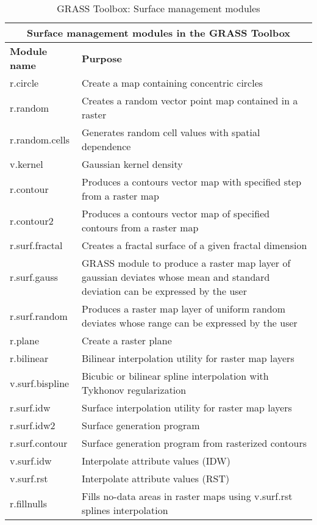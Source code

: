 \begin{table}[ht]
\centering
\caption{GRASS Toolbox: Surface management modules}\medskip
 \begin{tabular}{|p{4cm}|p{12cm}|}
  \hline \multicolumn{2}{|c|}{\textbf{Surface management modules in the GRASS
  Toolbox}} \\
  \hline \textbf{Module name} & \textbf{Purpose} \\
  \hline r.circle & Create a map containing concentric circles \\
  \hline r.random & Creates a random vector point map contained in a raster \\
  \hline r.random.cells & Generates random cell values with spatial
  dependence \\
  \hline v.kernel & Gaussian kernel density \\
  \hline r.contour & Produces a contours vector map with specified step from
  a raster map\\
  \hline r.contour2 & Produces a contours vector map of specified contours
  from a raster map \\
  \hline r.surf.fractal & Creates a fractal surface of a given fractal
  dimension\\
  \hline r.surf.gauss & GRASS module to produce a raster map layer of
  gaussian deviates whose mean and standard deviation can be expressed by the
  user \\
  \hline r.surf.random & Produces a raster map layer of uniform random
  deviates whose range can be expressed by the user \\
  \hline r.plane & Create a raster plane \\
  \hline r.bilinear & Bilinear interpolation utility for raster map layers \\
  \hline v.surf.bispline & Bicubic or bilinear spline interpolation with
  Tykhonov regularization\\
  \hline r.surf.idw & Surface interpolation utility for raster map layers\\
  \hline r.surf.idw2 & Surface generation program\\
  \hline r.surf.contour & Surface generation program from rasterized contours \\
  \hline v.surf.idw & Interpolate attribute values (IDW) \\
  \hline v.surf.rst & Interpolate attribute values (RST) \\
  \hline r.fillnulls & Fills no-data areas in raster maps using v.surf.rst
  splines interpolation \\
\hline
\end{tabular}
\end{table}





